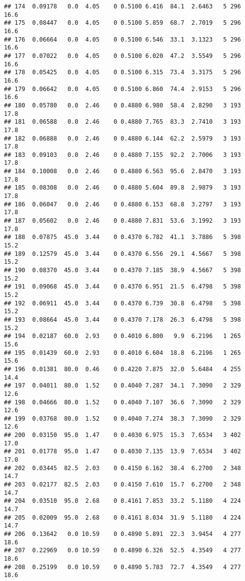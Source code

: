 \documentclass[]{article}
\begin{document}
\begin{verbatim}
## 174  0.09178   0.0  4.05    0 0.5100 6.416  84.1  2.6463   5 296    16.6
## 175  0.08447   0.0  4.05    0 0.5100 5.859  68.7  2.7019   5 296    16.6
## 176  0.06664   0.0  4.05    0 0.5100 6.546  33.1  3.1323   5 296    16.6
## 177  0.07022   0.0  4.05    0 0.5100 6.020  47.2  3.5549   5 296    16.6
## 178  0.05425   0.0  4.05    0 0.5100 6.315  73.4  3.3175   5 296    16.6
## 179  0.06642   0.0  4.05    0 0.5100 6.860  74.4  2.9153   5 296    16.6
## 180  0.05780   0.0  2.46    0 0.4880 6.980  58.4  2.8290   3 193    17.8
## 181  0.06588   0.0  2.46    0 0.4880 7.765  83.3  2.7410   3 193    17.8
## 182  0.06888   0.0  2.46    0 0.4880 6.144  62.2  2.5979   3 193    17.8
## 183  0.09103   0.0  2.46    0 0.4880 7.155  92.2  2.7006   3 193    17.8
## 184  0.10008   0.0  2.46    0 0.4880 6.563  95.6  2.8470   3 193    17.8
## 185  0.08308   0.0  2.46    0 0.4880 5.604  89.8  2.9879   3 193    17.8
## 186  0.06047   0.0  2.46    0 0.4880 6.153  68.8  3.2797   3 193    17.8
## 187  0.05602   0.0  2.46    0 0.4880 7.831  53.6  3.1992   3 193    17.8
## 188  0.07875  45.0  3.44    0 0.4370 6.782  41.1  3.7886   5 398    15.2
## 189  0.12579  45.0  3.44    0 0.4370 6.556  29.1  4.5667   5 398    15.2
## 190  0.08370  45.0  3.44    0 0.4370 7.185  38.9  4.5667   5 398    15.2
## 191  0.09068  45.0  3.44    0 0.4370 6.951  21.5  6.4798   5 398    15.2
## 192  0.06911  45.0  3.44    0 0.4370 6.739  30.8  6.4798   5 398    15.2
## 193  0.08664  45.0  3.44    0 0.4370 7.178  26.3  6.4798   5 398    15.2
## 194  0.02187  60.0  2.93    0 0.4010 6.800   9.9  6.2196   1 265    15.6
## 195  0.01439  60.0  2.93    0 0.4010 6.604  18.8  6.2196   1 265    15.6
## 196  0.01381  80.0  0.46    0 0.4220 7.875  32.0  5.6484   4 255    14.4
## 197  0.04011  80.0  1.52    0 0.4040 7.287  34.1  7.3090   2 329    12.6
## 198  0.04666  80.0  1.52    0 0.4040 7.107  36.6  7.3090   2 329    12.6
## 199  0.03768  80.0  1.52    0 0.4040 7.274  38.3  7.3090   2 329    12.6
## 200  0.03150  95.0  1.47    0 0.4030 6.975  15.3  7.6534   3 402    17.0
## 201  0.01778  95.0  1.47    0 0.4030 7.135  13.9  7.6534   3 402    17.0
## 202  0.03445  82.5  2.03    0 0.4150 6.162  38.4  6.2700   2 348    14.7
## 203  0.02177  82.5  2.03    0 0.4150 7.610  15.7  6.2700   2 348    14.7
## 204  0.03510  95.0  2.68    0 0.4161 7.853  33.2  5.1180   4 224    14.7
## 205  0.02009  95.0  2.68    0 0.4161 8.034  31.9  5.1180   4 224    14.7
## 206  0.13642   0.0 10.59    0 0.4890 5.891  22.3  3.9454   4 277    18.6
## 207  0.22969   0.0 10.59    0 0.4890 6.326  52.5  4.3549   4 277    18.6
## 208  0.25199   0.0 10.59    0 0.4890 5.783  72.7  4.3549   4 277    18.6

\end{verbatim}
\end{document}
